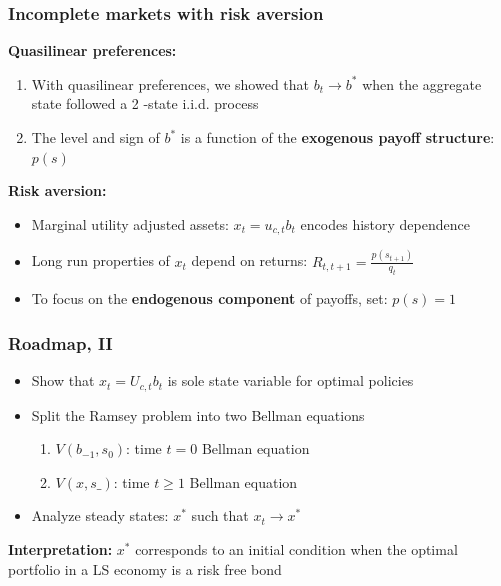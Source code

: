 \documentclass{beamer}
\begin{document}
\begin{frame}
 \frametitle{Incomplete markets with risk aversion}
 \textbf{Quasilinear preferences: }
 \begin{enumerate}
  \item With quasilinear preferences, we showed that $b_t\to b^*$ when the aggregate state followed a 2 -state i.i.d. process
  \item The level  and sign of $b^*$ is a function of the \textbf{exogenous payoff structure}: $p(s)$
 \end{enumerate}

 \textbf{Risk aversion:}
  \begin{itemize}
   \item Marginal utility adjusted assets: $x_t=u_{c,t}b_{t}$ encodes history dependence
   \item Long run properties of $x_t$ depend on returns: $R_{t,t+1}=\frac{p(s_{t+1})}{q_t}$
   \item To focus on the \textbf{endogenous component} of payoffs, set:  $p(s)=1$
  \end{itemize}
  \end{frame}
%
\begin{frame}
\frametitle{Roadmap, II}
\begin{itemize}

\item Show that $x_t=U_{c,t}b_{t}$ is sole state variable for optimal policies

\item Split the Ramsey problem into two Bellman equations
\begin{enumerate}
 \item $V(b_{-1},s_0)$: time $t=0$ Bellman equation
 \item $V(x,s\_)$:  time $t\geq 1$ Bellman equation
\end{enumerate}

\item Analyze steady states: $x^*$ such that $x_t \to x^*$

\end{itemize}
\textbf{Interpretation:}  $x^*$  corresponds to an initial condition when the optimal portfolio in a LS economy is a risk free bond

\end{frame}
\end{document}
